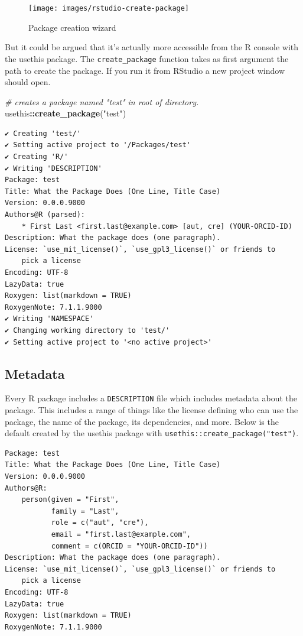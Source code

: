\documentclass[
  10pt,
]{krantz}
\makeatletter
\newenvironment{Shaded}{\begin{snugshade}}{\end{snugshade}}
\newcommand{\CommentTok}[1]{\textcolor[rgb]{0.37,0.37,0.37}{\textit{#1}}}
\newcommand{\KeywordTok}[1]{\textcolor[rgb]{0.27,0.27,0.27}{\textbf{#1}}}
\newcommand{\NormalTok}[1]{#1}
\newcommand{\OperatorTok}[1]{\textcolor[rgb]{0.43,0.43,0.43}{\textbf{#1}}}
\newcommand{\StringTok}[1]{\textcolor[rgb]{0.5,0.5,0.5}{#1}}
\newenvironment{kframe}{%
\medskip{}
\setlength{\fboxsep}{.8em}
 \def\at@end@of@kframe{}%
 \ifinner\ifhmode%
  \def\at@end@of@kframe{\end{minipage}}%
  \begin{minipage}{\columnwidth}%
 \fi\fi%
 \def\FrameCommand##1{\hskip\@totalleftmargin \hskip-\fboxsep
 \colorbox{shadecolor}{##1}\hskip-\fboxsep
     \hskip-\linewidth \hskip-\@totalleftmargin \hskip\columnwidth}%
 \MakeFramed {\advance\hsize-\width
   \@totalleftmargin\z@ \linewidth\hsize
   \@setminipage}}%
 {\par\unskip\endMakeFramed%
 \at@end@of@kframe}
\renewenvironment{Shaded}{\begin{kframe}}{\end{kframe}}
\makeatother
\begin{document}
\begin{figure}[H]

{\centering \texttt{[image: images/rstudio-create-package]} 

}

\caption{Package creation wizard}\label{fig:rstudio-create-package}
\end{figure}

But it could be argued that it's actually more accessible from the R console with the usethis package. The \texttt{create\_package} function takes as first argument the path to create the package. If you run it from RStudio a new project window should open.

\begin{Shaded}
\begin{Highlighting}[]
\CommentTok{\# creates a package named "test" in root of directory.}
\NormalTok{usethis}\OperatorTok{::}\KeywordTok{create\_package}\NormalTok{(}\StringTok{"test"}\NormalTok{)}
\end{Highlighting}
\end{Shaded}

\begin{verbatim}
✔ Creating 'test/'
✔ Setting active project to '/Packages/test'
✔ Creating 'R/'
✔ Writing 'DESCRIPTION'
Package: test
Title: What the Package Does (One Line, Title Case)
Version: 0.0.0.9000
Authors@R (parsed):
    * First Last <first.last@example.com> [aut, cre] (YOUR-ORCID-ID)
Description: What the package does (one paragraph).
License: `use_mit_license()`, `use_gpl3_license()` or friends to
    pick a license
Encoding: UTF-8
LazyData: true
Roxygen: list(markdown = TRUE)
RoxygenNote: 7.1.1.9000
✔ Writing 'NAMESPACE'
✔ Changing working directory to 'test/'
✔ Setting active project to '<no active project>'
\end{verbatim}

\hypertarget{basics-metadata}{%
\subsection{Metadata}\label{basics-metadata}}

Every R package includes a \texttt{DESCRIPTION} file which includes metadata about the package. This includes a range of things like the license defining who can use the package, the name of the package, its dependencies, and more. Below is the default created by the usethis package with \texttt{usethis::create\_package("test")}.

\begin{verbatim}
Package: test
Title: What the Package Does (One Line, Title Case)
Version: 0.0.0.9000
Authors@R: 
    person(given = "First",
           family = "Last",
           role = c("aut", "cre"),
           email = "first.last@example.com",
           comment = c(ORCID = "YOUR-ORCID-ID"))
Description: What the package does (one paragraph).
License: `use_mit_license()`, `use_gpl3_license()` or friends to
    pick a license
Encoding: UTF-8
LazyData: true
Roxygen: list(markdown = TRUE)
RoxygenNote: 7.1.1.9000
\end{verbatim}
\end{document}

